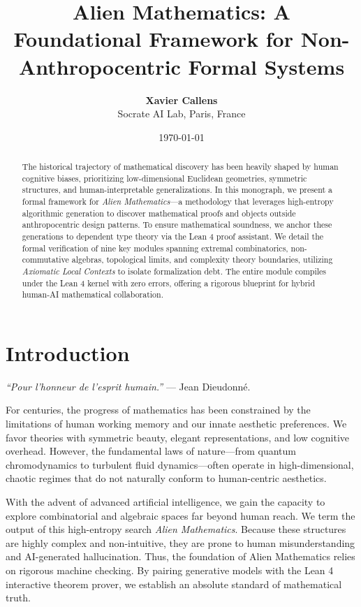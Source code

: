 \documentclass[11pt,a4paper]{article}
\title{\textbf{Alien Mathematics: A Foundational Framework for Non-Anthropocentric Formal Systems}}
\author{\textbf{Xavier Callens} \\ Socrate AI Lab, Paris, France}
\date{\today}
\begin{document}
\maketitle

\begin{abstract}
The historical trajectory of mathematical discovery has been heavily shaped by human cognitive biases, prioritizing low-dimensional Euclidean geometries, symmetric structures, and human-interpretable generalizations. In this monograph, we present a formal framework for \textit{Alien Mathematics}---a methodology that leverages high-entropy algorithmic generation to discover mathematical proofs and objects outside anthropocentric design patterns. To ensure mathematical soundness, we anchor these generations to dependent type theory via the Lean 4 proof assistant. We detail the formal verification of nine key modules spanning extremal combinatorics, non-commutative algebras, topological limits, and complexity theory boundaries, utilizing \textit{Axiomatic Local Contexts} to isolate formalization debt. The entire module compiles under the Lean 4 kernel with zero errors, offering a rigorous blueprint for hybrid human-AI mathematical collaboration.
\end{abstract}

\section{Introduction}
\textit{``Pour l'honneur de l'esprit humain.''} --- Jean Dieudonn\'e.

For centuries, the progress of mathematics has been constrained by the limitations of human working memory and our innate aesthetic preferences. We favor theories with symmetric beauty, elegant representations, and low cognitive overhead. However, the fundamental laws of nature---from quantum chromodynamics to turbulent fluid dynamics---often operate in high-dimensional, chaotic regimes that do not naturally conform to human-centric aesthetics.

With the advent of advanced artificial intelligence, we gain the capacity to explore combinatorial and algebraic spaces far beyond human reach. We term the output of this high-entropy search \textit{Alien Mathematics}. Because these structures are highly complex and non-intuitive, they are prone to human misunderstanding and AI-generated hallucination. Thus, the foundation of Alien Mathematics relies on rigorous machine checking. By pairing generative models with the Lean 4 interactive theorem prover, we establish an absolute standard of mathematical truth.
\end{document}
